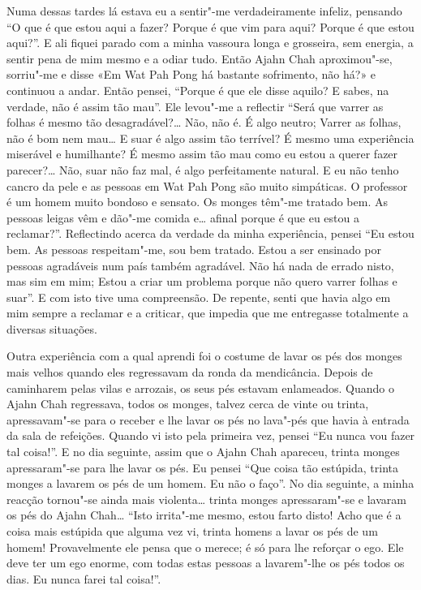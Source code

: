 Numa dessas tardes lá estava eu a sentir"-me verdadeiramente infeliz, pensando “O
que é que estou aqui a fazer? Porque é que vim para aqui? Porque é que estou
aqui?”. E ali fiquei parado com a minha vassoura longa e grosseira, sem energia, 
a sentir pena de mim mesmo e a odiar tudo. Então Ajahn Chah
aproximou"-se, sorriu"-me e disse «Em Wat Pah Pong há bastante sofrimento, não
há?» e continuou a andar. Então pensei, “Porque é que ele disse aquilo? E sabes,
na verdade, não é assim tão mau”. Ele levou"-me a reflectir “Será que varrer as
folhas é mesmo tão desagradável?\ldots{} Não, não é. É algo neutro;
Varrer as folhas, não é bom nem mau\ldots{} E suar é algo assim tão terrível? É
mesmo uma experiência miserável e humilhante? É mesmo assim tão mau como eu
estou a querer fazer parecer?\ldots{} Não, suar não faz mal, é algo
perfeitamente natural. E eu não tenho cancro da pele e as pessoas em Wat Pah
Pong são muito simpáticas. O professor é um homem muito bondoso e sensato. Os
monges têm"-me tratado bem. As pessoas leigas vêm e dão"-me comida e\ldots{}
afinal porque é que eu estou a reclamar?”. Reflectindo acerca da verdade da
minha experiência, pensei “Eu estou bem. As pessoas respeitam"-me, sou bem
tratado. Estou a ser ensinado por pessoas agradáveis num país também agradável.
Não há nada de errado nisto, mas sim em mim; Estou a criar um problema porque não
quero varrer folhas e suar”. E com isto tive uma compreensão. De repente, senti
que havia algo em mim sempre a reclamar e a criticar, que impedia que me
entregasse totalmente a diversas situações.

Outra experiência com a qual aprendi foi o costume de lavar os pés dos monges
mais velhos quando eles regressavam da ronda da mendicância. Depois de
caminharem pelas vilas e arrozais, os seus pés estavam enlameados. Quando o
Ajahn Chah regressava, todos os monges, talvez cerca de vinte ou trinta,
apressavam"-se para o receber e lhe lavar os pés no lava"-pés que havia à entrada
da sala de refeições. Quando vi isto pela primeira vez, pensei “Eu nunca vou
fazer tal coisa!”. E no dia seguinte, assim que o Ajahn Chah apareceu, trinta
monges apressaram"-se para lhe lavar os pés. Eu pensei “Que coisa tão estúpida,
trinta monges a lavarem os pés de um homem. Eu não o faço”. No dia seguinte, a
minha reacção tornou"-se ainda mais violenta\ldots{} trinta monges apressaram"-se e
lavaram os pés do Ajahn Chah\ldots{} “Isto irrita"-me mesmo, estou farto disto! Acho
que é a coisa mais estúpida que alguma vez vi, trinta homens a lavar os pés de
um homem! Provavelmente ele pensa que o merece; é só para lhe reforçar o ego.
Ele deve ter um ego enorme, com todas estas pessoas a lavarem"-lhe os pés todos
os dias. Eu nunca farei tal coisa!”.

